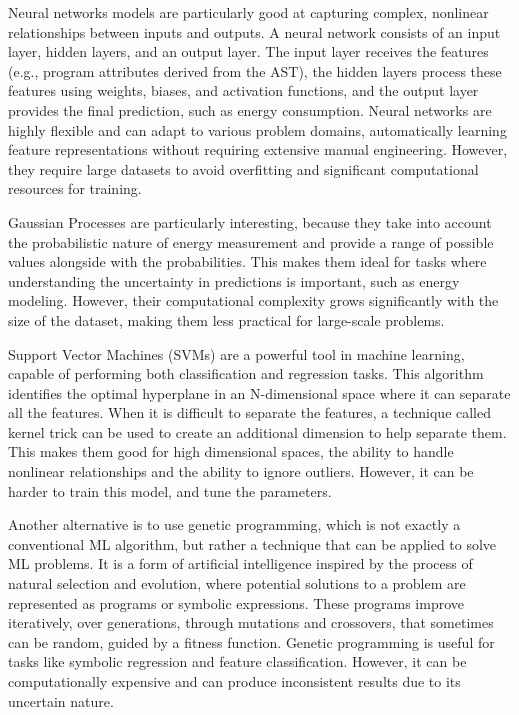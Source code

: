 \documentclass[sigplan]{acmart}
\begin{document}
Neural networks models are particularly good at capturing complex, nonlinear relationships between inputs and outputs. A neural network consists of an input layer, hidden layers, and an output layer. The input layer receives the features (e.g., program attributes derived from the AST), the hidden layers process these features using weights, biases, and activation functions, and the output layer provides the final prediction, such as energy consumption. Neural networks are highly flexible and can adapt to various problem domains, automatically learning feature representations without requiring extensive manual engineering. However, they require large datasets to avoid overfitting and significant computational resources for training.

Gaussian Processes are particularly interesting, because they take into account the probabilistic nature of energy measurement and provide a range of possible values alongside with the probabilities. This makes them ideal for tasks where understanding the uncertainty in predictions is important, such as energy modeling. However, their computational complexity grows significantly with the size of the dataset, making them less practical for large-scale problems.

Support Vector Machines (SVMs) are a powerful tool in machine learning, capable of performing both classification and regression tasks. This algorithm identifies the optimal hyperplane in an N-dimensional space where it can separate all the features. When it is difficult to separate the features, a technique called kernel trick can be used to create an additional dimension to help separate them. This makes them good for high dimensional spaces, the ability to handle nonlinear relationships and the ability to ignore outliers. However, it can be harder to train this model, and tune the parameters.

Another alternative is to use genetic programming, which is not exactly a conventional ML algorithm, but rather a technique that can be applied to solve ML problems. It is a form of artificial intelligence inspired by the process of natural selection and evolution, where potential solutions to a problem are represented as programs or symbolic expressions. These programs improve iteratively, over generations, through mutations and crossovers, that sometimes can be random, guided by a fitness function. Genetic programming is useful for tasks like symbolic regression and feature classification. However, it can be computationally expensive and can produce inconsistent results due to its uncertain nature.
\end{document}
